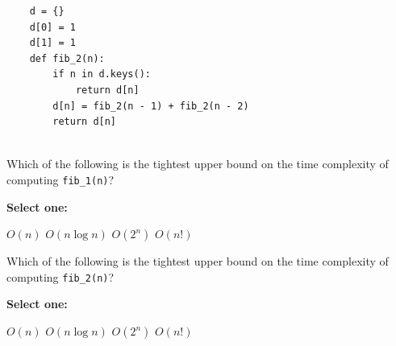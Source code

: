 \documentclass[11pt,addpoints,answers]{exam}
\numberwithin{equation}{section} %
\numberwithin{figure}{section} %
\numberwithin{table}{section} %
\begin{document}
\begin{questions}
\begin{lstlisting}
    d = {}
    d[0] = 1
    d[1] = 1
    def fib_2(n):
        if n in d.keys():
            return d[n]
        d[n] = fib_2(n - 1) + fib_2(n - 2)
        return d[n]
        
    \end{lstlisting}
    
    \question[2] Which of the following is the tightest upper bound on the time complexity of computing \lstinline{fib_1(n)}? 

    \textbf{Select one:}
    \begin{checkboxes}
        \choice $O(n)$
        \choice $O(n \log n)$
        \choice $O(2^n)$
        \choice $O(n!)$
    \end{checkboxes}

    
    \question[2] Which of the following is the tightest upper bound on the time complexity of computing \lstinline{fib_2(n)}? 

    \textbf{Select one:}
    \begin{checkboxes}
        \choice $O(n)$
        \choice $O(n \log n)$
        \choice $O(2^n)$
        \choice $O(n!)$
    \end{checkboxes}

    
    
    
    

    \clearpage
\end{questions}

%

\end{document}
